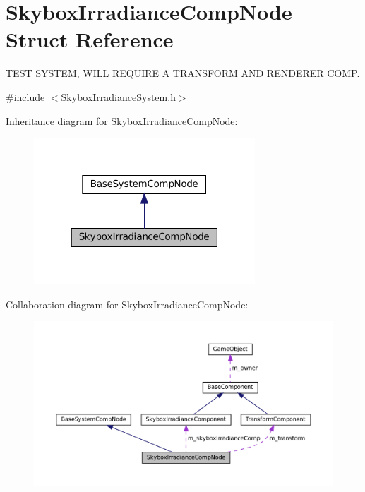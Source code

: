 \hypertarget{structSkyboxIrradianceCompNode}{}\section{Skybox\+Irradiance\+Comp\+Node Struct Reference}
\label{structSkyboxIrradianceCompNode}


T\+E\+ST S\+Y\+S\+T\+EM, W\+I\+LL R\+E\+Q\+U\+I\+RE A T\+R\+A\+N\+S\+F\+O\+RM A\+ND R\+E\+N\+D\+E\+R\+ER C\+O\+MP.  




{\ttfamily \#include $<$Skybox\+Irradiance\+System.\+h$>$}



Inheritance diagram for Skybox\+Irradiance\+Comp\+Node\+:
\nopagebreak
\begin{figure}[H]
\begin{center}
\leavevmode
\includegraphics[width=235pt]{structSkyboxIrradianceCompNode__inherit__graph}
\end{center}
\end{figure}


Collaboration diagram for Skybox\+Irradiance\+Comp\+Node\+:
\nopagebreak
\begin{figure}[H]
\begin{center}
\leavevmode
\includegraphics[width=350pt]{structSkyboxIrradianceCompNode__coll__graph}
\end{center}
\end{figure}
